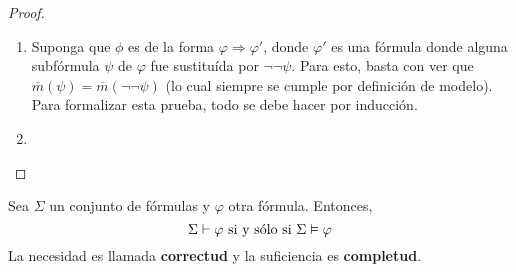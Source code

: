 \documentclass[12pt]{report}
\newcounter{it}
\theoremstyle{largebreak}
\begin{document}
\begin{proof}
\begin{enumerate}
            \item Suponga que $\phi$ es de la forma $\varphi\Rightarrow\varphi'$, donde $\varphi'$ es una fórmula donde alguna subfórmula $\psi$ de $\varphi$ fue sustituída por $\neg\neg\psi$. Para esto, basta con ver que $\overline{m}(\psi)=\overline{m}(\neg\neg\psi)$ (lo cual siempre se cumple por definición de modelo). Para formalizar esta prueba, todo se debe hacer por inducción. %
            
            \item %
        \end{enumerate}
    \end{proof}

    \begin{theor}
        Sea $\Sigma$ un conjunto de fórmulas y $\varphi$ otra fórmula. Entonces,
        \begin{equation*}
            \Sigma\vdash\varphi\textup{ si y sólo si }\Sigma\vDash\varphi
        \end{equation*}
        La necesidad es llamada \textbf{correctud} y la suficiencia es \textbf{completud}.
    \end{theor}
\end{document}
